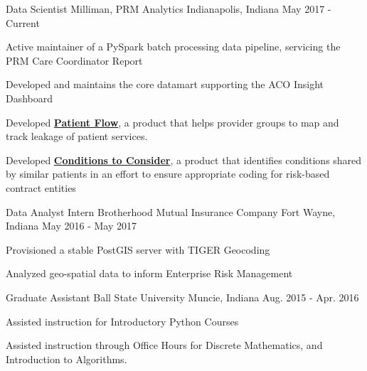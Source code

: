 

\begin{cventries}

  \cventry
    {Data Scientist} %
    {Milliman, PRM Analytics} %
    {Indianapolis, Indiana} %
    {May 2017 - Current} %
    {
      \begin{cvitems} %
        \item {Active maintainer of a PySpark batch processing data pipeline, servicing the PRM Care Coordinator Report}
        \item {Developed and maintains the core datamart supporting the ACO Insight Dashboard}
        \item {Developed \href{http://www.medinsight.milliman.com/uploadedFiles/MedInsight_Site/About/MedInsight-Patient-Flow.pdf}{\textbf{Patient Flow}}, a product that helps provider groups to map and track leakage of patient services.}
    \item {Developed \href{http://assets.milliman.com/ektron/medinsight-machine-learning-conditions-consider.pdf}{\textbf{Conditions to Consider}}, a product that identifies conditions shared by similar patients in an effort to ensure appropriate coding for risk-based contract entities}
      \end{cvitems}
    }

  \cventry
    {Data Analyst Intern} %
    {Brotherhood Mutual Insurance Company} %
    {Fort Wayne, Indiana} %
    {May 2016 - May 2017} %
    {
      \begin{cvitems} %
        \item {Provisioned a stable PostGIS server with TIGER Geocoding}
        \item {Analyzed geo-spatial data to inform Enterprise Risk Management}
      \end{cvitems}
    }

  \cventry
    {Graduate Assistant} %
    {Ball State University} %
    {Muncie, Indiana} %
    {Aug. 2015 - Apr. 2016} %
    {
      \begin{cvitems} %
        \item {Assisted instruction for Introductory Python Courses}
        \item {Assisted instruction through Office Hours for Discrete Mathematics, and Introduction to Algorithms.}
      \end{cvitems}
    }

\end{cventries}

